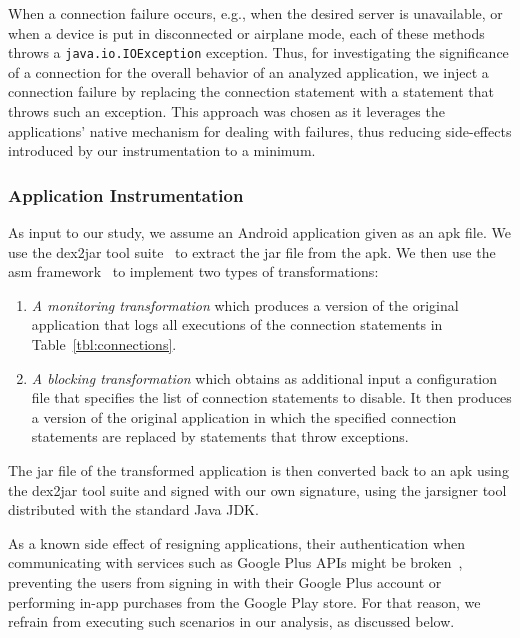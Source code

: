 When a connection failure occurs, e.g., when the desired server is unavailable, or when a device is put in disconnected or airplane mode, each of these methods throws a \texttt{java.io.IOException} exception. 
Thus, for investigating the significance of a connection for the overall behavior of an analyzed application, we inject a connection failure by replacing the connection statement with a statement that throws such an exception. 
This approach was chosen as it leverages the applications' native mechanism for dealing with failures, thus reducing side-effects introduced by our instrumentation to a minimum.

\subsubsection{Application Instrumentation}
As input to our study, we assume an Android application given as an apk file. 
We use the dex2jar tool suite~\cite{dex2jar} to extract the jar file from the apk.
We then use the asm framework~\cite{asm} to implement two types of transformations: 
\begin{enumerate}[leftmargin=0.5cm]%
\item \emph{A monitoring transformation} which produces a version of the original application that logs all executions of the connection statements in Table~\ref{tbl:connections}. 
\item \emph{A blocking transformation} which obtains as additional input a configuration file that specifies the list of connection statements to disable. It then produces a version of the original application in which the specified connection statements are replaced by statements that throw exceptions.
\end{enumerate}
The jar file of the transformed application is then converted back to an apk using the dex2jar tool suite and signed with our own signature, using the jarsigner tool distributed with the standard Java JDK.
 
As a known side effect of resigning applications, their authentication when communicating with services such as Google Plus APIs might be broken~\cite{googleAPI}, preventing the users from signing in with their Google Plus account or performing in-app purchases from the Google Play store. For that reason, we refrain from executing such scenarios in our analysis, as discussed below. 

